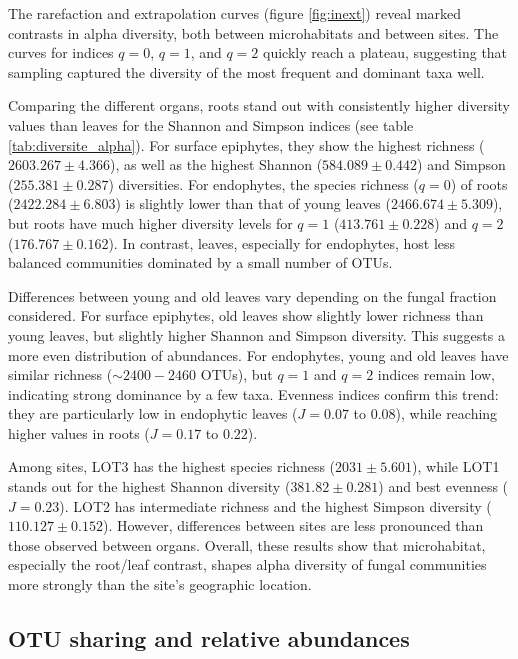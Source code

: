 \documentclass[alpha-refs,twocolumn]{wiley-article}
\begin{document}
The rarefaction and extrapolation curves (figure \ref{fig:inext}) reveal marked contrasts in alpha diversity, both between microhabitats and between sites. The curves for indices \(q=0\), \(q=1\), and \(q=2\) quickly reach a plateau, suggesting that sampling captured the diversity of the most frequent and dominant taxa well.

Comparing the different organs, roots stand out with consistently higher diversity values than leaves for the Shannon and Simpson indices (see table \ref{tab:diversite_alpha}). For surface epiphytes, they show the highest richness (\(2603.267 \pm 4.366\)), as well as the highest Shannon (\(584.089 \pm 0.442\)) and Simpson (\(255.381 \pm 0.287\)) diversities. For endophytes, the species richness (\(q=0\)) of roots (\(2422.284 \pm 6.803\)) is slightly lower than that of young leaves (\(2466.674 \pm 5.309\)), but roots have much higher diversity levels for \(q=1\) (\(413.761 \pm 0.228\)) and \(q=2\) (\(176.767 \pm 0.162\)). In contrast, leaves, especially for endophytes, host less balanced communities dominated by a small number of OTUs.

Differences between young and old leaves vary depending on the fungal fraction considered. For surface epiphytes, old leaves show slightly lower richness than young leaves, but slightly higher Shannon and Simpson diversity. This suggests a more even distribution of abundances. For endophytes, young and old leaves have similar richness (\(\sim 2400{-}2460\) OTUs), but \(q=1\) and \(q=2\) indices remain low, indicating strong dominance by a few taxa. Evenness indices confirm this trend: they are particularly low in endophytic leaves (\(J = 0.07\) to \(0.08\)), while reaching higher values in roots (\(J = 0.17\) to \(0.22\)).

Among sites, LOT3 has the highest species richness (\(2031 \pm 5.601\)), while LOT1 stands out for the highest Shannon diversity (\(381.82 \pm 0.281\)) and best evenness (\(J = 0.23\)). LOT2 has intermediate richness and the highest Simpson diversity (\(110.127 \pm 0.152\)). However, differences between sites are less pronounced than those observed between organs. Overall, these results show that microhabitat, especially the root/leaf contrast, shapes alpha diversity of fungal communities more strongly than the site's geographic location.

\subsection{OTU sharing and relative abundances}
\end{document}
